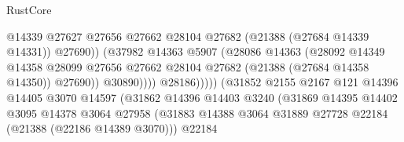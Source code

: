 \begin{lexlean}{RustCore}
\begin{coremodule}
                                                  @14339
                                                  @27627
                                                  @27656
                                                  @27662
                                                  @28104
                                                  @27682
                                                  (@21388 (@27684 @14339 @14331))
                                                  @27690))
                                              (@37982
                                                @14363
                                                @5907
                                                (@28086
                                                  @14363
                                                  (@28092
                                                    @14349
                                                    @14358
                                                    @28099
                                                    @27656
                                                    @27662
                                                    @28104
                                                    @27682
                                                    (@21388 (@27684 @14358 @14350))
                                                    @27690))
                                                @30890))))
                                        @28186)))))
                              (@31852
                                @2155
                                @2167
                                @121
                                @14396
                                @14405
                                @3070
                                @14597
                                (@31862
                                  @14396
                                  @14403
                                  @3240
                                  (@31869
                                    @14395
                                    @14402
                                    @3095
                                    @14378
                                    @3064
                                    @27958
                                    (@31883
                                      @14388
                                      @3064
                                      @31889
                                      @27728
                                      @22184
                                      (@21388 (@22186 @14389 @3070)))
                                    @22184

\end{coremodule}
\end{lexlean}
